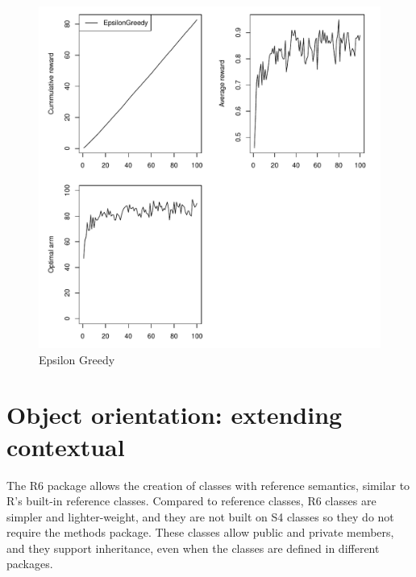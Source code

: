 \documentclass[nojss]{jss}\usepackage[]{graphicx}\usepackage[]{color}
\makeatletter
\def\maxwidth{ %
  \ifdim\Gin@nat@width>\linewidth
    \linewidth
  \else
    \Gin@nat@width
  \fi
}
\newenvironment{knitrout}{}{} %
\makeatother
\begin{document}
\begin{center}
\begin{knitrout}
\color{fgcolor}\begin{figure}
\includegraphics[width=\maxwidth]{figure/fig1-1} \caption[Epsilon Greedy]{Epsilon Greedy}\label{fig:fig1}
\end{figure}


\end{knitrout}
\end{center}



\section{Object orientation: extending contextual}

The R6 package allows the creation of classes with reference semantics, similar to R's built-in reference classes. Compared to reference classes, R6 classes are simpler and lighter-weight, and they are not built on S4 classes so they do not require the methods package. These classes allow public and private members, and they support inheritance, even when the classes are defined in different packages.
\end{document}
